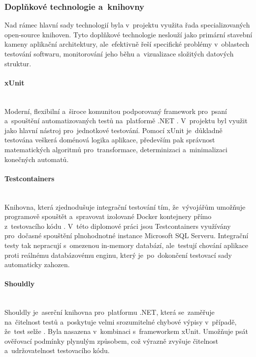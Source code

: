 \documentclass[
  master,
  program=ainfvs,
  printversion,
  figures=false,
  tables=false,
  glossaries,
  index
]{kidiplom}
\begin{document}
\subsubsection{Doplňkové technologie a~knihovny}
Nad rámec hlavní sady technologií byla v~projektu využita řada specializovaných open-source knihoven. Tyto doplňkové technologie neslouží jako primární stavební kameny aplikační architektury, ale~efektivně řeší specifické problémy v~oblastech testování softwaru, monitorování jeho běhu a~vizualizace složitých datových struktur.

\paragraph{xUnit} \mbox{} \\
Moderní, flexibilní a~široce komunitou podporovaný framework pro~psaní a~spouštění automatizovaných testů na~platformě .NET \cite{xunit_docs}. V~projektu byl využit jako hlavní nástroj pro~jednotkové testování. Pomocí xUnit je~důkladně testována veškerá doménová logika aplikace, především pak správnost matematických algoritmů pro~transformace, determinizaci a~minimalizaci konečných automatů.

\paragraph{Testcontainers} \label{par:testcontainers} \mbox{} \\
Knihovna, která zjednodušuje integrační testování tím, že~vývojářům umožňuje programově spouštět a~spravovat izolované Docker kontejnery přímo z~testovacího kódu \cite{testcontainers_docs}. V~této diplomové práci jsou Testcontainers využívány pro~dočasné spouštění plnohodnotné instance Microsoft SQL Serveru. Integrační testy tak nepracují s~omezenou in-memory databází, ale~testují chování aplikace proti reálnému databázovému enginu, který je~po~dokončení testovací sady automaticky zahozen.

\paragraph{Shouldly} \mbox{} \\
Shouldly je~aserční knihovna pro~platformu .NET, která se~zaměřuje na~čitelnost testů a~poskytuje velmi srozumitelné chybové výpisy v~případě, že~test selže \cite{shouldly_docs}. Byla nasazena v~kombinaci s~frameworkem xUnit. Umožňuje psát ověřovací podmínky plynulým způsobem, což výrazně zvyšuje čitelnost a~udržovatelnost testovacího kódu.
\end{document}
